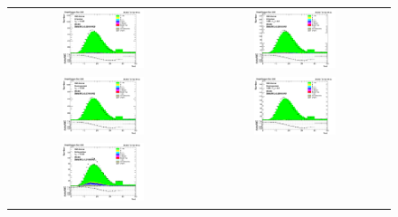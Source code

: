 \begin{figure}[htp]
  \begin{center}
    \begin{tabular}{cc}
      \includegraphics[width=0.45\textwidth]{figures/Zprime/2016/ScaleFactor/SameSign/nominal/stack_nVtx_Barrel_probes_PUW.png} &
      \includegraphics[width=0.45\textwidth]{figures/Zprime/2016/ScaleFactor/SameSign/nominal/stack_nVtx_Endcap_probes_PUW.png} \\
      \includegraphics[width=0.45\textwidth]{figures/Zprime/2016/ScaleFactor/SameSign/nominal/stack_nVtx_Barrel_pass_PUW.png} &
      \includegraphics[width=0.45\textwidth]{figures/Zprime/2016/ScaleFactor/SameSign/nominal/stack_nVtx_Endcap_pass_PUW.png}\\
      \includegraphics[width=0.45\textwidth]{figures/Zprime/2016/ScaleFactor/SameSign/nominal/stack_nVtx_Barrel_fail_PUW.png} &

\end{tabular}
\end{center}
\end{figure}
